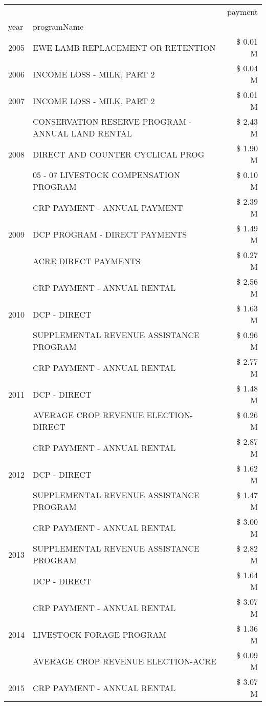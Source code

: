 \begin{tabular}{llr}
\toprule
 &  & payment \\
year & programName &  \\
\midrule
2005 & EWE LAMB REPLACEMENT OR RETENTION & \$ 0.01 M \\
\cline{1-3}
2006 & INCOME LOSS - MILK, PART 2 & \$ 0.04 M \\
\cline{1-3}
2007 & INCOME LOSS - MILK, PART 2 & \$ 0.01 M \\
\cline{1-3}
\multirow[t]{3}{*}{2008} & CONSERVATION RESERVE PROGRAM - ANNUAL LAND RENTAL & \$ 2.43 M \\
 & DIRECT AND COUNTER CYCLICAL PROG & \$ 1.90 M \\
 & 05 - 07 LIVESTOCK COMPENSATION PROGRAM & \$ 0.10 M \\
\cline{1-3}
\multirow[t]{3}{*}{2009} & CRP PAYMENT - ANNUAL PAYMENT & \$ 2.39 M \\
 & DCP PROGRAM - DIRECT PAYMENTS & \$ 1.49 M \\
 & ACRE DIRECT PAYMENTS & \$ 0.27 M \\
\cline{1-3}
\multirow[t]{3}{*}{2010} & CRP PAYMENT - ANNUAL RENTAL & \$ 2.56 M \\
 & DCP - DIRECT & \$ 1.63 M \\
 & SUPPLEMENTAL REVENUE ASSISTANCE PROGRAM & \$ 0.96 M \\
\cline{1-3}
\multirow[t]{3}{*}{2011} & CRP PAYMENT - ANNUAL RENTAL & \$ 2.77 M \\
 & DCP - DIRECT & \$ 1.48 M \\
 & AVERAGE CROP REVENUE ELECTION-DIRECT & \$ 0.26 M \\
\cline{1-3}
\multirow[t]{3}{*}{2012} & CRP PAYMENT - ANNUAL RENTAL & \$ 2.87 M \\
 & DCP - DIRECT & \$ 1.62 M \\
 & SUPPLEMENTAL REVENUE ASSISTANCE PROGRAM & \$ 1.47 M \\
\cline{1-3}
\multirow[t]{3}{*}{2013} & CRP PAYMENT - ANNUAL RENTAL & \$ 3.00 M \\
 & SUPPLEMENTAL REVENUE ASSISTANCE PROGRAM & \$ 2.82 M \\
 & DCP - DIRECT & \$ 1.64 M \\
\cline{1-3}
\multirow[t]{3}{*}{2014} & CRP PAYMENT - ANNUAL RENTAL & \$ 3.07 M \\
 & LIVESTOCK FORAGE PROGRAM & \$ 1.36 M \\
 & AVERAGE CROP REVENUE ELECTION-ACRE & \$ 0.09 M \\
\cline{1-3}
\multirow[t]{3}{*}{2015} & CRP PAYMENT - ANNUAL RENTAL & \$ 3.07 M \\

\end{tabular}
